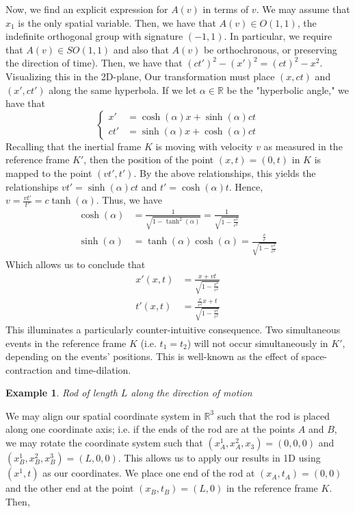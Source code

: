 \documentclass{article}
\newcommand{\R}{\mathbb R}
\newcommand{\nl}{\newline\newline\noindent}
\newcommand{\al}{\alpha}
\newtheorem{ex}{Example}
\begin{document}
\nl
Now, we find an explicit expression for $A(v)$ in terms of $v$. We may assume that $x_1$ is the only spatial variable. Then, we have that $A(v)\in O(1,1)$, the indefinite orthogonal group with signature $(-1,1)$. In particular, we require that $A(v)\in SO(1,1)$ and also that $A(v)$ be orthochronous, or preserving the direction of time). Then, we have that $(ct')^2-(x')^2 = (ct)^2 - x^2$. Visualizing this in the 2D-plane, Our transformation must place $(x,ct)$ and $(x',ct')$ along the same hyperbola. If we let $\al\in \R$ be the "hyperbolic angle," we have that
\[\left\{\begin{aligned}
    x' &= \cosh(\al)x + \sinh(\al)ct\\
    ct' &= \sinh(\al)x + \cosh(\al)ct
\end{aligned}\right.\]
Recalling that the inertial frame $K$ is moving with velocity $v$ as measured in the reference frame $K'$, then the position of the point $(x,t) = (0,t)$ in $K$ is mapped to the point $(vt',t')$. By the above relationships, this yields the relationships $vt' = \sinh(\al)ct$ and $t' = \cosh(\al)t$. Hence,
$v= \frac{vt'}{t'} = c\tanh(\al)$. Thus, we have
\begin{align*}
    \cosh(\al) &= \frac{1}{\sqrt{1-\tanh^2(\al)}} = \frac{1}{\sqrt{1-\frac{v^2}{c^2}}}\\
    \sinh(\al) &= \tanh(\al)\cosh(\al) = \frac{\frac{v}{c}}{\sqrt{1-\frac{v^2}{c^2}}}
\end{align*}
Which allows us to conclude that
\begin{align*}
    x'(x,t)&=\frac{x+vt}{\sqrt{1-\frac{v^2}{c^2}}}\\
    t'(x,t) &=\frac{\frac{v}{c^2}x + t}{\sqrt{1-\frac{v^2}{c^2}}}
\end{align*}
This illuminates a particularly counter-intuitive consequence. Two simultaneous events in the reference frame $K$ (i.e. $t_1 = t_2$) will not occur simultaneously in $K'$, depending on the events' positions. This is well-known as the effect of space-contraction and time-dilation. 
\begin{ex}
    Rod of length $L$ along the direction of motion
\end{ex}
We may align our spatial coordinate system in $\R^3$ such that the rod is placed along one coordinate axis; i.e. if the ends of the rod are at the points $A$ and $B$, we may rotate the coordinate system such that $(x_A^1, x_A^2, x_3) = (0,0,0)$ and $(x_B^1, x_B^2, x_B^3) = (L,0,0)$. This allows us to apply our results in 1D using $(x^1,t)$ as our coordinates. We place one end of the rod at $(x_A,t_A) = (0,0)$ and the other end at the point $(x_B,t_B) = (L,0)$ in the reference frame $K$. Then, 
\end{document}
